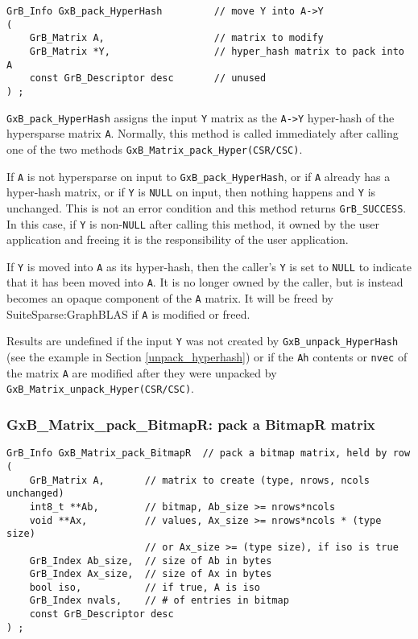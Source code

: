 \documentclass[12pt]{article}
\begin{document}
\begin{mdframed}[userdefinedwidth=6in]
{\footnotesize
\begin{verbatim}
GrB_Info GxB_pack_HyperHash         // move Y into A->Y
(
    GrB_Matrix A,                   // matrix to modify
    GrB_Matrix *Y,                  // hyper_hash matrix to pack into A
    const GrB_Descriptor desc       // unused
) ;
\end{verbatim}
} \end{mdframed}

\verb'GxB_pack_HyperHash' assigns the input \verb'Y' matrix as the \verb'A->Y'
hyper-hash of the hypersparse matrix \verb'A'.  Normally, this method is called
immediately after calling one of the two methods
\verb'GxB_Matrix_pack_Hyper(CSR/CSC)'.

If \verb'A' is not hypersparse on input to \verb'GxB_pack_HyperHash', or if
\verb'A' already has a hyper-hash matrix, or if \verb'Y' is \verb'NULL' on
input, then nothing happens and \verb'Y' is unchanged.  This is not an error
condition and this method returns \verb'GrB_SUCCESS'.  In this case, if
\verb'Y' is non-\verb'NULL' after calling this method, it owned by the user
application and freeing it is the responsibility of the user application.

If \verb'Y' is moved into \verb'A' as its hyper-hash, then the caller's
\verb'Y' is set to \verb'NULL' to indicate that it has been moved into
\verb'A'.  It is no longer owned by the caller, but is instead becomes an
opaque component of the \verb'A' matrix.  It will be freed by
SuiteSparse:GraphBLAS if \verb'A' is modified or freed.

Results are undefined if the input \verb'Y' was not created by
\verb'GxB_unpack_HyperHash' (see the example in Section \ref{unpack_hyperhash})
or if the \verb'Ah' contents or \verb'nvec' of the matrix \verb'A' are modified
after they were unpacked by \verb'GxB_Matrix_unpack_Hyper(CSR/CSC)'.

\newpage
\subsubsection{{\sf GxB\_Matrix\_pack\_BitmapR:} pack a BitmapR matrix}
\label{matrix_pack_bitmapr}

\begin{mdframed}[userdefinedwidth=6in]
{\footnotesize
\begin{verbatim}
GrB_Info GxB_Matrix_pack_BitmapR  // pack a bitmap matrix, held by row
(
    GrB_Matrix A,       // matrix to create (type, nrows, ncols unchanged)
    int8_t **Ab,        // bitmap, Ab_size >= nrows*ncols
    void **Ax,          // values, Ax_size >= nrows*ncols * (type size)
                        // or Ax_size >= (type size), if iso is true
    GrB_Index Ab_size,  // size of Ab in bytes
    GrB_Index Ax_size,  // size of Ax in bytes
    bool iso,           // if true, A is iso
    GrB_Index nvals,    // # of entries in bitmap
    const GrB_Descriptor desc
) ;
\end{verbatim}
} \end{mdframed}
\end{document}
